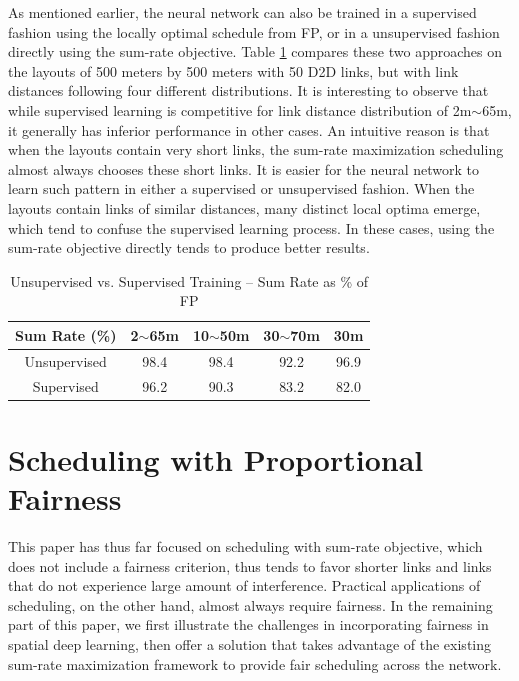 \documentclass[journal,12pt,onecolumn,draftclsnofoot,]{IEEEtran}
\begin{document}
As mentioned earlier, the neural network can also be trained in a supervised 
fashion using the locally optimal schedule from FP, or in a unsupervised fashion
directly using the sum-rate objective. Table \ref{tab:supervisedVSunsupervised}
compares these two approaches on the layouts of 500 meters by 500 meters with
50 D2D links, but with link distances following four different distributions. 
It is interesting to observe that while supervised learning is competitive for
link distance distribution of 2m$\sim$65m, it generally has inferior performance
in other cases. An intuitive reason is that when the layouts contain very short
links, the sum-rate maximization scheduling almost always chooses these short
links. It is easier for the neural network to learn such pattern in
either a supervised or unsupervised fashion. When the layouts contain links of
similar distances, many distinct local optima emerge, which tend to confuse the
supervised learning process. In these cases, using the sum-rate objective
directly tends to produce better results. 

\begin{table}
\caption{Unsupervised vs. Supervised Training -- Sum Rate as \% of FP}
\centering
\begin{tabular}{|c||c|c|c|c|}
\hline
Sum Rate (\%) & 2$\sim$65m & 10$\sim$50m & 30$\sim$70m & 30m\\
\hline
Unsupervised & 98.4 & 98.4 & 92.2 & 96.9 \\
\hline
Supervised & 96.2 & 90.3 & 83.2 & 82.0 \\ 
\hline
\end{tabular}
\label{tab:supervisedVSunsupervised}
\end{table}


\section{Scheduling with Proportional Fairness}

This paper has thus far focused on scheduling with sum-rate objective, which
does not include a fairness criterion, thus tends to favor shorter links and links
that do not experience large amount of interference. Practical applications
of scheduling, on the other hand, almost always require fairness.  In the
remaining part of this paper, we first illustrate the challenges in incorporating
fairness in spatial deep learning, then offer a solution that takes advantage
of the existing sum-rate maximization framework to provide fair scheduling
across the network.
\end{document}
